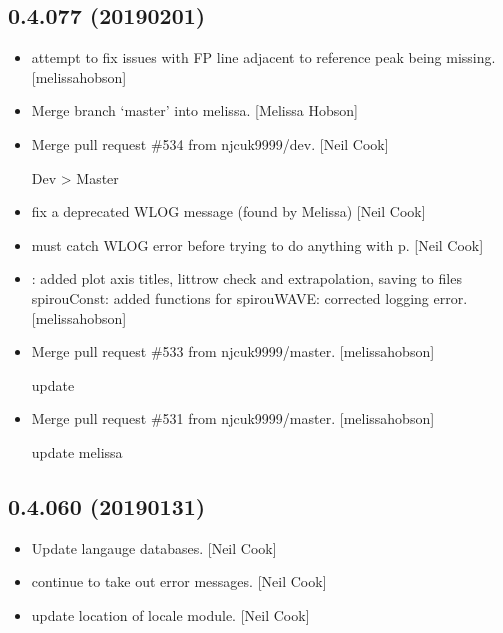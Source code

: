 \documentclass[a4paper,10pt,english]{report}
\begin{document}
\subsection{0.4.077 (2019\sphinxhyphen{}02\sphinxhyphen{}01)}
\label{\detokenize{misc/changelog:id218}}\begin{itemize}
\item {} 
 attempt to fix issues with FP line adjacent to
reference peak being missing. {[}melissa\sphinxhyphen{}hobson{]}

\item {} 
Merge branch ‘master’ into melissa. {[}Melissa Hobson{]}

\item {} 
Merge pull request \#534 from njcuk9999/dev. {[}Neil Cook{]}

Dev \textendash{}\textgreater{} Master

\item {} 
 \sphinxhyphen{} fix a deprecated WLOG message (found by Melissa) {[}Neil
Cook{]}

\item {} 
 \sphinxhyphen{} must catch WLOG error before trying to do anything with
p. {[}Neil Cook{]}

\item {} 
: added plot axis titles, littrow check and
extrapolation, saving to files spirouConst: added functions for
 spirouWAVE: corrected logging error. {[}melissa\sphinxhyphen{}hobson{]}

\item {} 
Merge pull request \#533 from njcuk9999/master. {[}melissa\sphinxhyphen{}hobson{]}

update

\item {} 
Merge pull request \#531 from njcuk9999/master. {[}melissa\sphinxhyphen{}hobson{]}

update melissa

\end{itemize}


\subsection{0.4.060 (2019\sphinxhyphen{}01\sphinxhyphen{}31)}
\label{\detokenize{misc/changelog:id219}}\begin{itemize}
\item {} 
Update langauge databases. {[}Neil Cook{]}

\item {} 
 \sphinxhyphen{} continue to take out error messages. {[}Neil Cook{]}

\item {} 
 \sphinxhyphen{} update location of locale module. {[}Neil Cook{]}

\end{itemize}
\end{document}
